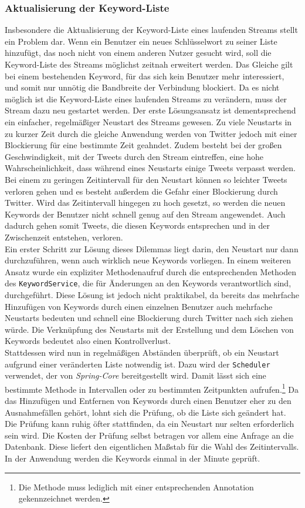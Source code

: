 \subsubsection*{Aktualisierung der Keyword-Liste}
Insbesondere die Aktualisierung der Keyword-Liste eines laufenden Streams stellt ein Problem dar. Wenn ein Benutzer ein neues Schlüsselwort zu seiner Liste hinzufügt, das noch nicht von einem anderen Nutzer gesucht wird, soll die Keyword-Liste des Streams möglichst zeitnah erweitert werden. Das Gleiche gilt bei einem bestehenden Keyword, für das sich kein Benutzer mehr interessiert, und somit nur unnötig die Bandbreite der Verbindung blockiert. Da es nicht möglich ist die Keyword-Liste eines laufenden Streams zu verändern, muss der Stream dazu neu gestartet werden. Der erste Lösungsansatz ist dementsprechend ein einfacher, regelmäßiger Neustart des Streams gewesen. Zu viele Neustarts in zu kurzer Zeit durch die gleiche Anwendung werden von Twitter jedoch mit einer Blockierung für eine bestimmte Zeit geahndet. Zudem besteht bei der großen Geschwindigkeit, mit der Tweets durch den Stream eintreffen, eine hohe Wahrscheinlichkeit, dass während eines Neustarts einige Tweets verpasst werden. Bei einem zu geringen Zeitintervall für den Neustart können so leichter Tweets verloren gehen und es besteht außerdem die Gefahr einer Blockierung durch Twitter. Wird das Zeitintervall hingegen zu hoch gesetzt, so werden die neuen Keywords der Benutzer nicht schnell genug auf den Stream angewendet. Auch dadurch gehen somit Tweets, die diesen Keywords entsprechen und in der Zwischenzeit entstehen, verloren. \\
Ein erster Schritt zur Lösung dieses Dilemmas liegt darin, den Neustart nur dann durchzuführen, wenn auch wirklich neue Keywords vorliegen. In einem weiteren Ansatz wurde ein expliziter Methodenaufruf durch die entsprechenden Methoden des \texttt{KeywordService}, die für Änderungen an den Keywords verantwortlich sind, durchgeführt. Diese Lösung ist jedoch nicht praktikabel, da bereits das mehrfache Hinzufügen von Keywords durch einen einzelnen Benutzer auch mehrfache Neustarts bedeuten und schnell eine Blockierung durch Twitter nach sich ziehen würde. Die Verknüpfung des Neustarts mit der Erstellung und dem Löschen von Keywords bedeutet also einen Kontrollverlust. \\
Stattdessen wird nun in regelmäßigen Abständen überprüft, ob ein Neustart aufgrund einer veränderten Liste notwendig ist. Dazu wird der \texttt{Scheduler} verwendet, der von \textit{Spring-Core} bereitgestellt wird. Damit lässt sich eine bestimmte Methode in Intervallen oder zu bestimmten Zeitpunkten aufrufen.\footnote{Die Methode muss lediglich mit einer entsprechenden Annotation gekennzeichnet werden.} Da das Hinzufügen und Entfernen von Keywords durch einen Benutzer eher zu den Ausnahmefällen gehört, lohnt sich die Prüfung, ob die Liste sich geändert hat. Die Prüfung kann ruhig öfter stattfinden, da ein Neustart nur selten erforderlich sein wird. Die Kosten der Prüfung selbst betragen vor allem eine Anfrage an die Datenbank. Diese liefert den eigentlichen Maßstab für die Wahl des Zeitintervalls. In der Anwendung werden die Keywords einmal in der Minute geprüft.
%
